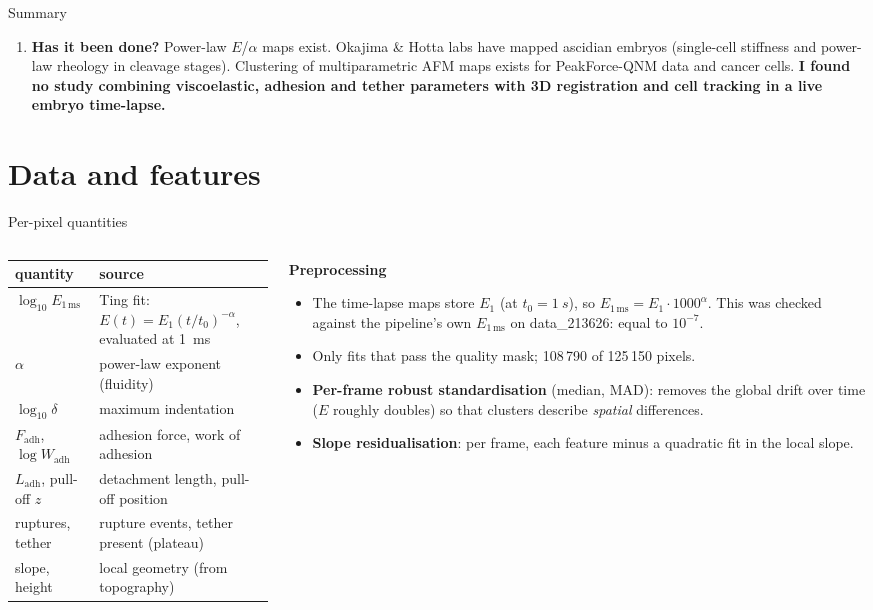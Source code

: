 \documentclass[aspectratio=169,9pt]{beamer}
\begin{document}
\begin{frame}{Summary}
\begin{enumerate}
\item \textbf{Has it been done?} Power-law $E$/$\alpha$ maps exist. Okajima \& Hotta labs have mapped ascidian embryos (single-cell stiffness and power-law rheology in cleavage stages). Clustering of multiparametric AFM maps exists for PeakForce-QNM data and cancer cells. \textbf{I found no study combining viscoelastic, adhesion and tether parameters with 3D registration and cell tracking in a live embryo time-lapse.}
\end{enumerate}
\end{frame}

\section{Data and features}

\begin{frame}{Per-pixel quantities}
\footnotesize
\begin{columns}[T]
\begin{column}{0.52\textwidth}
\begin{tabularx}{\linewidth}{@{}lX@{}}\toprule
quantity & source \\\midrule
$\log_{10}E_{1\,\mathrm{ms}}$ & Ting fit: $E(t)=E_1(t/t_0)^{-\alpha}$, evaluated at \SI{1}{ms} \\
$\alpha$ & power-law exponent (fluidity) \\
$\log_{10}\delta$ & maximum indentation \\
$F_\mathrm{adh}$, $\log W_\mathrm{adh}$ & adhesion force, work of adhesion \\
$L_\mathrm{adh}$, pull-off $z$ & detachment length, pull-off position \\
ruptures, tether & rupture events, tether present (plateau) \\
slope, height & local geometry (from topography) \\
\bottomrule\end{tabularx}
\end{column}
\begin{column}{0.45\textwidth}
\textbf{Preprocessing}
\begin{itemize}
\item The time-lapse maps store $E_1$ (at $t_0=\SI{1}{s}$), so $E_{1\,\mathrm{ms}}=E_1\cdot1000^{\alpha}$. This was checked against the pipeline's own $E_{1\,\mathrm{ms}}$ on data\_213626: equal to $10^{-7}$.
\item Only fits that pass the quality mask; 108\,790 of 125\,150 pixels.
\item \textbf{Per-frame robust standardisation} (median, MAD): removes the global drift over time ($E$ roughly doubles) so that clusters describe \emph{spatial} differences.
\item \textbf{Slope residualisation}: per frame, each feature minus a quadratic fit in the local slope.
\end{itemize}
\end{column}
\end{columns}
\end{frame}
\end{document}
